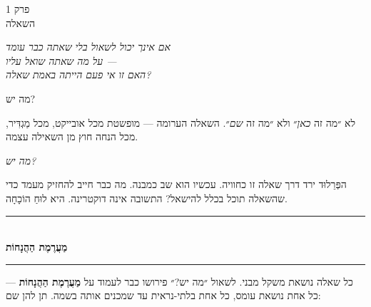 \documentclass[10pt, openany, oneside]{book}
\renewcommand{\normalsize}{\fontsize{10}{13}\selectfont}
\renewcommand{\large}{\fontsize{11.5}{14}\selectfont}
\renewcommand{\huge}{\fontsize{17}{21}\selectfont}
\begin{document}
%
%
%

\newpage

\begin{center}
    {\huge\textsc{פרק 1}}\\[0.3em]
    {\large\textsc{השאלה}}
\end{center}

\vspace{1.5em}

\begin{center}
    \textit{%
    אם אינך יכול לשאול בלי שאתה כבר עומד\\
    על מה שאתה שואל עליו —\\
    האם זו אי פעם הייתה באמת שאלה?}
\end{center}

\vspace{2em}


\noindent מה יש?

לא ״מה זה \textit{כאן}״ ולא ״מה זה \textit{שם}״. השאלה הערומה — מופשטת מכל אובייקט, מכל מַגְדִּיר, מכל הנחה חוץ מן השאילה עצמה.

\textit{מה יש?}

הפְּרֵלוּד ירד דרך שאלה זו כחוויה. עכשיו הוא שב כמבנה. מה כבר חייב להחזיק מעמד כדי שהשאלה תוכל בכלל להישאל? התשובה אינה דוקטרינה. היא לוּחַ הוֹכָחָה.

\vspace{1.5em}


\begin{center}
    \rule{0.3\textwidth}{0.4pt}\\[0.5em]
    {\normalsize\bfseries\textsc{מַעֲרֶמֶת הַהֲנָחוֹת}}\\[0.3em]
    \rule{0.3\textwidth}{0.4pt}
\end{center}

\vspace{1em}

כל שאלה נושאת משקל מבני. לשאול ״מה יש?״ פירושו כבר לעמוד על \textbf{מַעֲרֶמֶת הַהֲנָחוֹת} — כל אחת נושאת עומס, כל אחת בלתי-נראית עד שמכנים אותה בשמה. תן להן שם:
\end{document}
